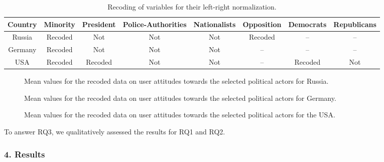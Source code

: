 \begin{table}[ht]%
	\centering
	\caption{Recoding of variables for their left-right normalization.}%
	\label{tab:variableLeftRightNormalization}%
		\begin{adjustbox}{width=1\textwidth}
				\small
		\begin{tabular}{ c  c  c  c  c  c  c  c }%
			\toprule
			Country & Minority & President & Police-Authorities & Nationalists & Opposition & Democrats & Republicans\\
			\hline
			Russia & Recoded & Not & Not & Not & Recoded & -- & --\\
			Germany & Recoded & Not & Not & Not & -- & -- & -- \\
			USA & Recoded & Recoded & Not & Not & -- & Recoded & Not \\
			\bottomrule
		\end{tabular}%
			\end{adjustbox}
\end{table}

\begin{figure}[ht]
	\caption{Mean values for the recoded data on user attitudes towards the selected political actors for Russia.}\label{fig:recordedDataRussia}
\end{figure}

\begin{figure}[ht]
	\caption{Mean values for the recoded data on user attitudes towards the selected political actors for Germany.}\label{fig:recordedDataGermany}
\end{figure}

\begin{figure}[ht]
	\caption{Mean values for the recoded data on user attitudes towards the selected political actors for the USA.}\label{fig:recordedDataUSA}
\end{figure}

To answer RQ3, we qualitatively assessed the results for RQ1 and RQ2.

\subsubsection{4. Results}

